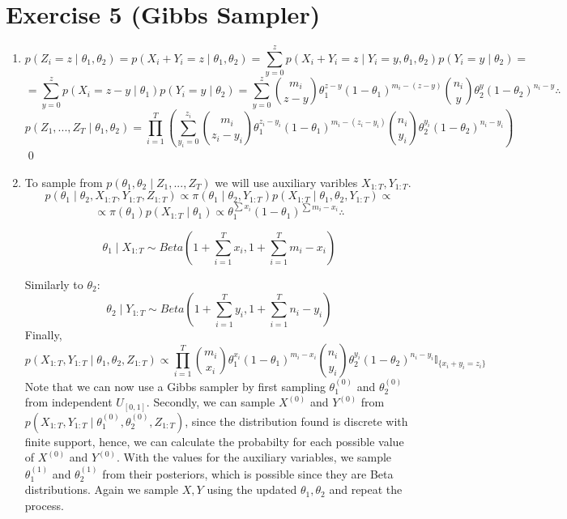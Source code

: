 \documentclass[12pt,letterpaper]{article}
\begin{document}
\section*{Exercise 5 (Gibbs Sampler)}
\begin{enumerate}[leftmargin=!,labelindent=5pt]
\item  
$$
p(Z_i = z \mid \theta_1, \theta_2) = p(X_i + Y_i = z \mid
\theta_1,\theta_2) =
\sum_{y = 0}^{z}p(X_i+Y_i = z \mid Y_i = y, \theta_1,\theta_2)
p(Y_i = y \mid \theta_2) =
$$
$$ = 
\sum_{y = 0}^{z}p(X_i = z - y \mid \theta_1 )p(Y_i = y\mid\theta_2) =
\sum_{y = 0}^{z}\binom{m_i}{z-y}
\theta_1^{z - y}(1-\theta_1)^{m_i - (z-y)}
\binom{n_i}{y}
\theta_2^{y}(1-\theta_2)^{n_i - y} \therefore
$$
$$
p(Z_1,...,Z_T \mid \theta_1, \theta_2) = 
\prod_{i=1}^{T}\left ( 
\sum_{y_i = 0}^{z_i}\binom{m_i}{z_i-y_i}
\theta_1^{z_i - y_i}(1-\theta_1)^{m_i - (z_i-y_i)}
\binom{n_i}{y_i}
\theta_2^{y_i}(1-\theta_2)^{n_i - y_i}
\right)
$$
\qed

\item To sample from
$
p(\theta_1,\theta_2 \mid Z_1,...,Z_T)
$
we will use auxiliary varibles $X_{1:T}, Y_{1:T}$. 
$$
p(\theta_1 \mid \theta_2, X_{1:T},Y_{1:T},Z_{1:T}) \propto 
\pi(\theta_1 \mid \theta_2, Y_{1:T})
p(X_{1:T} \mid \theta_1,\theta_2, Y_{1:T}) \propto
$$
$$
\propto 
\pi(\theta_1)p(X_{1:T}\mid \theta_1) \propto
\theta_1^{\sum x_i}(1-\theta_1)^{\sum m_i - x_i} \therefore
$$

$$
\theta_1 \mid X_{1:T} \sim Beta \left(
1 + \sum_{i=1}^T x_i, 1 + \sum_{i=1}^T m_i - x_i
\right)
$$

Similarly to $\theta_2$:
$$
\theta_2 \mid Y_{1:T} \sim Beta \left(
1 + \sum_{i=1}^T y_i, 1 + \sum_{i=1}^T n_i - y_i
\right)
$$
Finally,
$$
p(X_{1:T},Y_{1:T} \mid \theta_1, \theta_2, Z_{1:T}) \propto
\prod_{i=1}^{T}\binom{m_i}{x_i}\theta_1^{x_i}(1-\theta_1)^{m_i - x_i}
\binom{n_i}{y_i}\theta_2^{y_i}(1-\theta_2)^{n_i - y_i}
\mathbb{I}_{\{
x_i + y_i = z_i
\}}
$$
Note that we can now use a Gibbs sampler by first
sampling $\theta_1^{(0)}$
and  $\theta_2^{(0)}$ from independent $U_{[0,1]}$. Secondly, we can sample
$X^{(0)}$ and $Y^{(0)}$ from $p(X_{1:T},Y_{1:T}
\mid \theta_1^{(0)}, \theta_2^{(0)}, Z_{1:T})$,
since the distribution found is discrete with finite 
support, hence, we can calculate the probabilty for each possible value
of $X^{(0)}$ and $Y^{(0)}$.
With the values for the auxiliary variables, we 
sample $\theta_1^{(1)}$ and $\theta_2^{(1)}$ from their posteriors, which is possible
since they are Beta distributions. Again we sample $X,Y$ using the
updated $\theta_1,\theta_2$ and repeat the process.

\end{enumerate}
\end{document}
